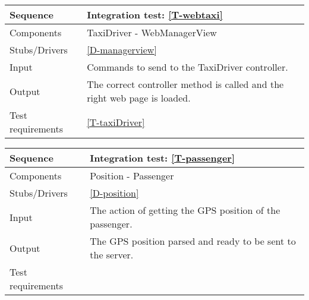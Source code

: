 \begin{table}[H]
    \begin{tabularx}{\textwidth}{l|X}
        \hline
        Sequence
        & 
        Integration test: \ref{T-webtaxi}
        \\ \hline
        Components 
        & 
        TaxiDriver -  WebManagerView
        \\ \hline
        Stubs/Drivers 
        & 
        \ref{D-managerview}
        \\ \hline
        Input 
        & 
        Commands to send to the TaxiDriver controller.
        \\ \hline
        Output 
        & 
        The correct controller method is called and the right web page is loaded.
        \\ \hline
        Test requirements 
        & 
        \ref{T-taxiDriver}
        \\ \hline
    \end{tabularx}
\end{table}


\begin{table}[H]
    \begin{tabularx}{\textwidth}{l|X}
        \hline
        Sequence
        & 
        Integration test: \ref{T-passenger}
        \\ \hline
        Components 
        & 
        Position - Passenger
        \\ \hline
        Stubs/Drivers 
        & 
        \ref{D-position}
        \\ \hline
        Input 
        & 
        The action of getting the GPS position of the passenger.
        \\ \hline
        Output 
        & 
        The GPS position parsed and ready to be sent to the server.
        \\ \hline
        Test requirements 
        & 
        
        \\ \hline
    \end{tabularx}
\end{table}


